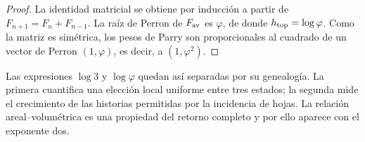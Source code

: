 \begin{proof}
La identidad matricial se obtiene por inducción a partir de
\(F_{n+1}=F_n+F_{n-1}\). La raíz de Perron de \(F_{\rm av}\) es \(\varphi\),
de donde \(h_{\rm top}=\log\varphi\). Como la matriz es simétrica, los pesos
de Parry \cite{v:Parry1964} son proporcionales al cuadrado de un vector de Perron
\((1,\varphi)\), es decir, a \((1,\varphi^2)\).
\end{proof}

Las expresiones \(\log3\) y \(\log\varphi\) quedan así separadas por su
genealogía. La primera cuantifica una elección local uniforme entre tres
estados; la segunda mide el crecimiento de las historias permitidas por la
incidencia de hojas. La relación areal--volumétrica es una propiedad del
retorno completo y por ello aparece con el exponente dos.

